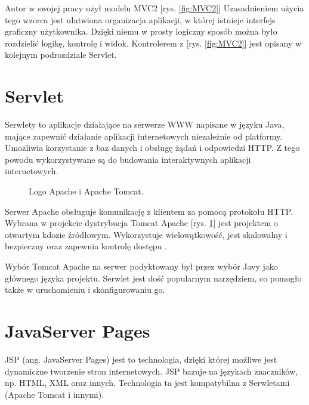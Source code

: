 \documentclass[eng,printmode,oneside]{mgr}
\begin{document}
Autor w swojej pracy użył modelu MVC2 [rys. \ref{fig:MVC2}]
Uzasadnieniem użycia tego wzorca jest ułatwiona organizacja aplikacji, w której
istnieje interfejs graficzny użytkownika. Dzięki niemu w prosty logiczny sposób
można było rozdzielić logikę, kontrolę i widok. Kontrolerem z [rys.
\ref{fig:MVC2}] jest opisany w kolejnym podrozdziale Servlet.

\newpage
\section{Servlet}

Serwlety to aplikacje działające na serwerze WWW napisane w języku Java, mające
zapewnić działanie aplikacji internetowych niezależnie od
platformy.
Umożliwia korzystanie z baz danych i obsługę żądań i odpowiedzi HTTP. Z tego
powodu wykorzystywane są do budowania interaktywnych aplikacji internetowych.

\begin{figure}
\centering
{}
\caption{\label{fig:apache}Logo Apache i Apache Tomcat.}
\end{figure}

Serwer Apache obsługuje komunikację z klientem za pomocą protokołu HTTP. Wybrana
w projekcie dystrybucja Tomcat Apache [rys. \ref{fig:apache}] jest projektem o
otwartym kdozie źródłowym. Wykorzystuje wielowątkowość, jest skalowalny i
bezpieczny oraz zapewnia kontrolę dostępu \cite{apache.wiki}.

Wybór Tomcat Apache na serwer podyktowany był przez wybór Javy jako głównego
języka projektu. Serwlet jest dość popularnym narzędziem, co pomogło także w
uruchomieniu i skonfigurowaniu go.

\section{JavaServer Pages}

JSP (ang. JavaServer Pages) jest to technologia, dzięki której możliwe jest
dynamiczne tworzenie stron internetowych. JSP bazuje na językach znaczników,
np.
HTML, XML oraz innych. Technologia ta jest kompatybilna z Serwletami (Apache
Tomcat i innymi).
\end{document}
